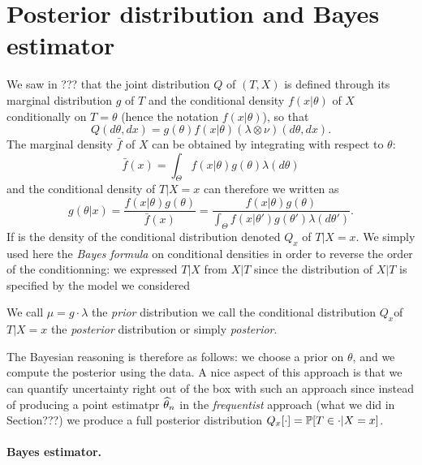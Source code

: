 \section{Posterior distribution and Bayes estimator} %
\label{sec:posterior_distribution_and_bayes_estimator}

We saw in ??? that the joint distribution $Q$ of $(T, X)$ is defined through its marginal distribution $g$ of $T$ and the conditional density $f(x | \theta)$ of $X$ conditionally on $T = \theta$ (hence the notation $f(x | \theta)$), so that
\begin{equation*}
	Q(d \theta, dx) = g(\theta) f(x | \theta) (\lambda \otimes \nu) (d\theta, dx). 	
\end{equation*} 
The marginal density $\bar f$ of $X$ can be obtained by integrating with respect to $\theta$:
\begin{equation*}
	\bar f(x) = \int_{\Theta} f(x | \theta) g(\theta) \lambda(d \theta)
\end{equation*}
and the conditional density of $T | X = x$ can therefore we written as
\begin{equation*}
	g(\theta | x) = \frac{f(x | \theta) g(\theta)}{\bar f(x)} = \frac{f(x | \theta) g(\theta)}{\int_{\Theta} f(x | \theta') g(\theta') \lambda(d \theta')}.
\end{equation*}
If is the density of the conditional distribution denoted $Q_x$ of $T | X = x$.
We simply used here the \emph{Bayes formula} on conditional densities in order to reverse the order of the conditionning: we expressed $T | X$ from $X | T$ since the distribution of $X | T$ is specified by the model we considered

\begin{definition}
	We call $\mu = g \cdot \lambda$ the \emph{prior} distribution we call the conditional distribution $Q_x$of $T | X=x$ the \emph{posterior} distribution or simply \emph{posterior}.
\end{definition}

The Bayesian reasoning is therefore as follows: we choose a prior on $\theta$, and we compute the posterior using the data. 
A nice aspect of this approach is that we can quantify uncertainty right out of the box with such an approach since instead of producing a point estimatpr $\wh \theta_n$ in the \emph{frequentist} approach (what we did in Section???) we produce a full posterior distribution $Q_x[\cdot] = \P[T \in \cdot | X = x]$.

\paragraph{Bayes estimator.} %

